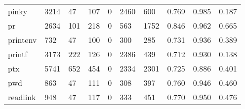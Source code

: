 \begin{longtable}{lp{1.3cm}p{1.3cm}p{1.3cm}p{1.3cm}p{1.3cm}p{1.3cm}p{1.3cm}p{1.3cm}p{1.3cm}}
pinky     &                   3214 &                                 47 &                               107 &                                0 &                              2460 &                             600 &                                0.769 &                                  0.985 &                                0.187 \\
pr        &                   2634 &                                101 &                               218 &                                0 &                               563 &                            1752 &                                0.846 &                                  0.962 &                                0.665 \\
printenv  &                    732 &                                 47 &                               100 &                                0 &                               300 &                             285 &                                0.731 &                                  0.936 &                                0.389 \\
printf    &                   3173 &                                222 &                               126 &                                0 &                              2386 &                             439 &                                0.712 &                                  0.930 &                                0.138 \\
ptx       &                   5741 &                                652 &                               454 &                                0 &                              2334 &                            2301 &                                0.725 &                                  0.886 &                                0.401 \\
pwd       &                    863 &                                 47 &                               111 &                                0 &                               308 &                             397 &                                0.760 &                                  0.946 &                                0.460 \\
readlink  &                    948 &                                 47 &                               117 &                                0 &                               333 &                             451 &                                0.770 &                                  0.950 &                                0.476 \\

\end{longtable}
